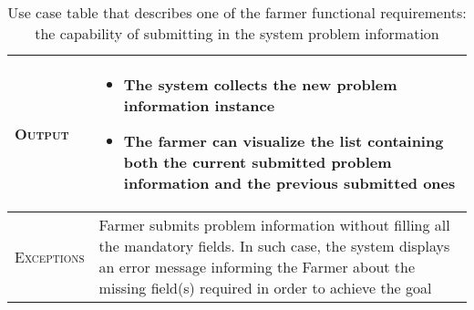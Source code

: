 \begin{table}[H]
\begin{tabular}{|l|p{}|}
    	\textsc{Output}             &  \begin{itemize}
    	    \item The system collects the new problem information instance
    	    \item The farmer can visualize the list containing both the current submitted problem information and the previous submitted ones
    	\end{itemize}\\
    	\hline %
    	\textsc{Exceptions}         &   Farmer submits problem information without filling all the mandatory fields. In such case, the system displays an error message informing the Farmer about the missing field(s) required in order to achieve the goal\\
    	\hline %
        
    \end{tabular}

\caption{\label{tab:problem_information}Use case table that describes one of the farmer functional requirements: the capability of submitting in the system problem information}
\end{table}
